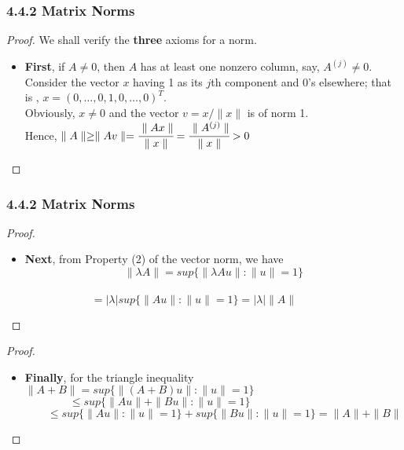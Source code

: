 \documentclass[notheorems,mathserif,table,compress]{beamer}  %
\begin{document}
\begin{frame}
  \frametitle{4.4.2 Matrix Norms}
  \begin{proof}
  We shall verify the \textbf{three} axioms for a norm.\\
  \begin{itemize}
  \item \textbf{First}, if $A\ne0$, then $A$ has at least one nonzero column, say, $A^{(j)}\ne0$. \\
  Consider the vector $x$ having 1 as its $j$th component and 0's elsewhere; that is , $x=(0,\ldots,0,1,0,\ldots,0)^T$.\\
  Obviously, $x\ne0$ and the vector $v=x/\parallel x\parallel$ is of norm 1.\\
  Hence, $\parallel A\parallel \ge \parallel Av\parallel=\cfrac{\parallel Ax\parallel}{\parallel x\parallel}=\cfrac{\parallel A^{(j)}\parallel}{\parallel x\parallel}>0$
  \end{itemize}
  \end{proof}
\end{frame}


\begin{frame}
  \frametitle{4.4.2 Matrix Norms}
  \begin{proof}
  \begin{itemize}
  \item \textbf{Next}, from Property (2) of the vector norm, we have
  \[\parallel\lambda A\parallel=sup\{\parallel\lambda Au\parallel:\parallel u\parallel=1\}\]\\
  $\qquad \qquad \qquad=|\lambda|sup\{\parallel Au\parallel:\parallel u\parallel=1\}=|\lambda|\parallel A\parallel$
  \end{itemize}
  \end{proof}
  \begin{proof}
  \begin{itemize}
  \item \textbf{Finally}, for the triangle inequality\\
  $\parallel A+B\parallel=sup\{\parallel(A+B)u\parallel:\parallel u\parallel=1\}$ \\
  $\quad \quad \quad \quad\le sup\{\parallel Au\parallel+\parallel Bu\parallel:\parallel u\parallel=1\}$\\
  $\quad \quad \le sup\{\parallel Au\parallel:\parallel u\parallel=1\} +sup\{ \parallel Bu\parallel:\parallel u\parallel=1\}=\parallel A\parallel+\parallel B\parallel$
  \end{itemize}
  \end{proof}
\end{frame}
\end{document}
